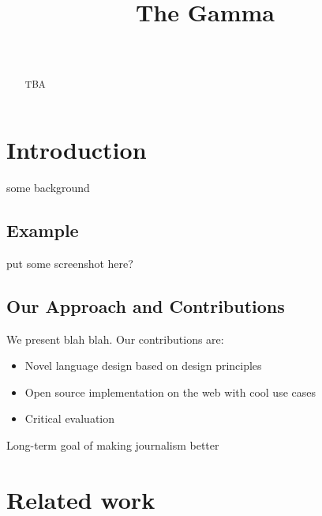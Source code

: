 \documentclass{sigchi}
\def\plaintitle{The Gamma}
\def\plainkeywords{Authors' choice; of terms; separated; by
  semicolons; include commas, within terms only; required.}
\begin{document}
\title{\plaintitle}

\author{%
  \\
}

\maketitle

\begin{abstract}
TBA
\end{abstract}

%

\section{Introduction}

some background

\subsection{Example}

put some screenshot here?

\subsection{Our Approach and Contributions}
We present blah blah.
Our contributions are:

\begin{itemize}
\item Novel language design based on design principles
\item Open source implementation on the web with cool use cases
\item Critical evaluation
\end{itemize}

Long-term goal of making journalism better

\section{Related work}
\end{document}
